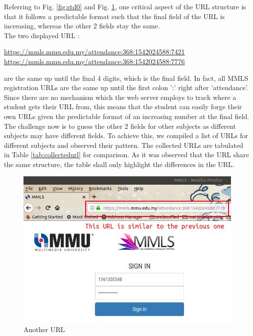\documentclass[runningheads]{llncs}
\begin{document}
Referring to Fig. \ref{fig:std0} and Fig. \ref{fig:std1}, one critical aspect of the URL structure is that it follows a predictable format such that the final field of the URL is increasing, whereas the other 2 fields stay the same. \\
The two displayed URL :
\begin{center}
\url{https://mmls.mmu.edu.my/attendance:368:1542024588:7421}\\ 
\url{https://mmls.mmu.edu.my/attendance:368:1542024588:7776}\\   
\end{center}
are the same up until the final 4 digits, which is the final field. In fact, all MMLS registration URLs are the same up until the first colon ':' right after 'attendance'. Since there are no mechanism which the web server employs to track where a student gets their URL from, this means that the student can easily forge their own URLs given the predictable format of an increasing number at the final field. The challenge now is to guess the other 2 fields for other subjects as different subjects may have different fields. To achieve this, we compiled a list of URLs for different subjects and observed their pattern. The collected URLs are tabulated in Table \ref{tab:collectedurl} for comparison. As it was observed that the URL share the same structure, the table shall only highlight the differences in the URL.

\begin{figure}
\includegraphics[width=\textwidth]{imgres/standard1_edit_painted.png}
\caption{Another URL} 
\label{fig:std1}
\centering
\end{figure}
\end{document}
